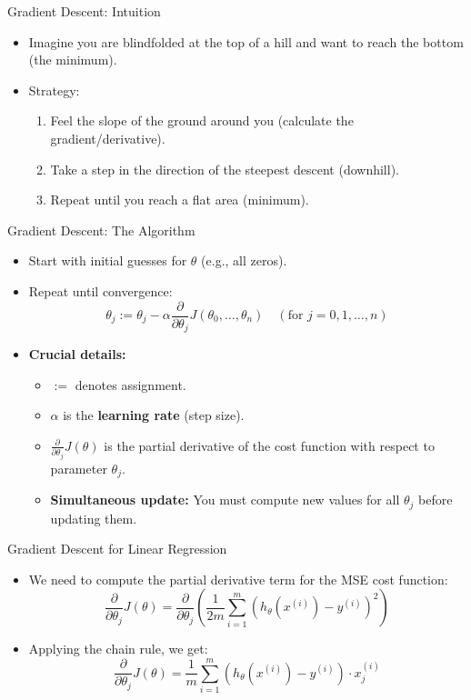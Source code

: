 \documentclass[aspectratio=169]{beamer}
\begin{document}
\begin{frame}{Gradient Descent: Intuition}
\begin{itemize}
    \item Imagine you are blindfolded at the top of a hill and want to reach the bottom (the minimum).
    \item Strategy:
    \begin{enumerate}
        \item Feel the slope of the ground around you (calculate the gradient/derivative).
        \item Take a step in the direction of the steepest descent (downhill).
        \item Repeat until you reach a flat area (minimum).
    \end{enumerate}
\end{itemize}
\end{frame}

\begin{frame}{Gradient Descent: The Algorithm}
\begin{itemize}
    \item Start with initial guesses for $\theta$ (e.g., all zeros).
    \item Repeat until convergence:
    $$ \theta_j := \theta_j - \alpha \frac{\partial}{\partial \theta_j} J(\theta_0, \dots, \theta_n) \quad (\text{for } j=0, 1, \dots, n) $$
    \item \textbf{Crucial details:}
        \begin{itemize}
            \item $:=$ denotes assignment.
            \item $\alpha$ is the \textbf{learning rate} (step size).
            \item $\frac{\partial}{\partial \theta_j} J(\theta)$ is the partial derivative of the cost function with respect to parameter $\theta_j$.
            \item \textbf{Simultaneous update:} You must compute new values for all $\theta_j$ before updating them.
        \end{itemize}
\end{itemize}
\end{frame}

\begin{frame}{Gradient Descent for Linear Regression}
\begin{itemize}
    \item We need to compute the partial derivative term for the MSE cost function:
    $$ \frac{\partial}{\partial \theta_j} J(\theta) = \frac{\partial}{\partial \theta_j} \left( \frac{1}{2m} \sum_{i=1}^{m} (h_\theta(x^{(i)}) - y^{(i)})^2 \right) $$
    \item Applying the chain rule, we get:
    $$ \frac{\partial}{\partial \theta_j} J(\theta) = \frac{1}{m} \sum_{i=1}^{m} (h_\theta(x^{(i)}) - y^{(i)}) \cdot x_j^{(i)} $$
\end{itemize}
\end{frame}
\end{document}
